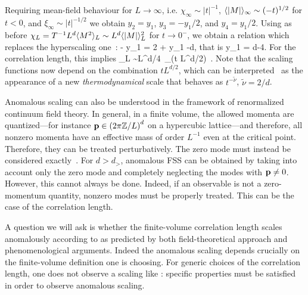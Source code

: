 \documentclass[12pt]{article}
\begin{document}
Requiring mean-field behaviour for $L\to\infty$, i.e. 
$\chi_\infty\sim |t|^{-1}$, $\langle|M|\rangle_\infty\sim (-t)^{1/2}$ for $t<0$, 
and $\xi_\infty\sim |t|^{-1/2}$ we obtain 
$y_2=  y_1$, $y_3=-y_1/2$, and $y_4=y_1/2$. 
Using as before $\chi_L = T^{-1} L^d \langle M^2\rangle_L \sim L^d\langle|M|\rangle_L^2$ for 
$t\to 0^-$, we 
obtain a relation which replaces the hyperscaling one~:
 - y_1 = 2 + y_1 -d, \ee
that is
\be
y_1 = {d-4}.
\ee
For the correlation length, this implies 
\be
\xi_L \sim L^{d/4}\,  _\xi(t L^{d/2})\, .
\label{anomalous}
\ee
Note that the scaling functions now depend  on the combination 
$t L^{d/2}$, which can be interpreted~\cite{Young} as the appearance
of a new {\em thermodynamical}
scale that behaves as $t^{-\tilde{\nu}}$, $\tilde{\nu} = 2/d$.

Anomalous scaling can also be understood in the framework of 
renormalized continuum field theory. In general, in a finite volume,
the allowed momenta are quantized---for instance 
${\mathbf{p}} \in \left( 2 \pi {\mathbb Z}/L \right)^d$ on a hypercubic 
lattice---and therefore,
all nonzero momenta
have an effective mass of order $L^{-1}$ even at the critical point.
Therefore, they can be treated perturbatively. The zero mode must instead be
considered exactly~\cite{Brezin85,Rudnick}. For $d>d_>$,
anomalous FSS can be obtained by taking into account only
the zero mode and completely neglecting the modes with ${\mathbf{p}}\not=0$.
However, this  cannot always be done.
Indeed, if an observable is not a zero-momentum quantity, 
nonzero modes must be properly treated. 
This can be the case of the correlation length. 

A question we will ask is whether the finite-volume 
correlation length 
scales anomalously according to  as predicted by both
field-theoretical approach  and  phenomenological arguments. 
Indeed the anomalous scaling depends crucially on the finite-volume 
definition one is choosing. For generic choices of the correlation length,
one does not observe a scaling like : specific properties
must be satisfied in order to observe anomalous scaling. 
\end{document}
